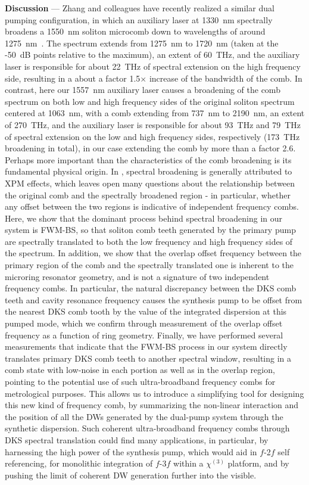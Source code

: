 \documentclass[reprint,superscriptaddress, amsmath,amssymb,pra, aps,floatfix,longbibliography]{revtex4-1}
\begin{document}
\noindent\textbf{Discussion} — Zhang and colleagues have recently realized a similar dual pumping configuration, in which an auxiliary laser at 1330~nm spectrally broadens a 1550~nm soliton microcomb down to wavelengths of around 1275~nm~\cite{zhang_spectral_2020}. The spectrum extends from 1275~nm to 1720~nm (taken at the -50~dB points relative to the maximum), an extent of 60~THz, and the auxiliary laser is responsible for about 22~THz of spectral extension on the high frequency side, resulting in a about a factor 1.5$\times$ increase of the bandwidth of the comb. In contrast, here our 1557~nm auxiliary laser causes a broadening of the comb spectrum on both low and high frequency sides of the original soliton spectrum centered at 1063~nm, with a comb extending from 737~nm to 2190~nm, an extent of 270~THz, and the auxiliary laser is responsible for about 93~THz and 79~THz of spectral extension on the low and high frequency sides, respectively (173~THz broadening in total), in our case extending the comb by more than a factor 2.6. Perhaps more important than the characteristics of the comb broadening is its fundamental physical origin. In \cite{zhang_spectral_2020}, spectral broadening is generally attributed to XPM effects, which leaves open many questions about the relationship between the original comb and the spectrally broadened region - in particular, whether any offset between the two regions is indicative of independent frequency combs. Here, we show that the dominant process behind spectral broadening in our system is FWM-BS, so that soliton comb teeth generated by the primary pump are spectrally translated to both the low frequency and high frequency sides of the spectrum. In addition, we show that the overlap offset frequency between the primary region of the comb and the spectrally translated one is inherent to the microring resonator geometry, and is not a signature of two independent frequency combs. In particular, the natural discrepancy between the DKS comb teeth and cavity resonance frequency causes the synthesis pump to be offset from the nearest DKS comb tooth by the value of the integrated dispersion at this pumped mode, which we confirm through measurement of the overlap offset frequency as a function of ring geometry. Finally, we have performed several measurements that indicate that the FWM-BS process in our system directly translates primary DKS comb teeth to another spectral window, resulting in a comb state with low-noise in each portion as well as in the overlap region, pointing to the potential use of such ultra-broadband frequency combs for metrological purposes. This allows us to introduce a simplifying tool for designing this new kind of frequency comb, by summarizing the non-linear interaction and the position of all the DWs generated by the dual-pump system through the synthetic dispersion. Such coherent ultra-broadband frequency combs through DKS spectral translation could find many applications, in particular, by harnessing the high power of the synthesis pump, which would aid in $f$-2$f$ self referencing, for monolithic integration of $f$-3$f$ within a $\chi^{(3)}$ platform, and by pushing the limit of coherent DW generation further into the visible.
\end{document}
